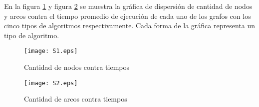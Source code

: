\documentclass{article}
\begin{document}
En la figura \ref{Figura8} y figura \ref{Figura9} se muestra la gráfica de dispersión de cantidad de nodos y arcos contra el tiempo promedio de ejecución de cada uno de los grafos con los cinco tipos de algoritmos respectivamente. Cada forma de la gráfica representa un tipo de algoritmo. 

\begin{figure}[h]
\centering
\texttt{[image: S1.eps]}  
\caption{Cantidad de nodos contra tiempos}
\label{Figura8}
\end{figure}


\begin{figure}[h]
\centering
\texttt{[image: S2.eps]}  
\caption{Cantidad de arcos contra tiempos}
\label{Figura9}
\end{figure}

\newpage


\end{document}
